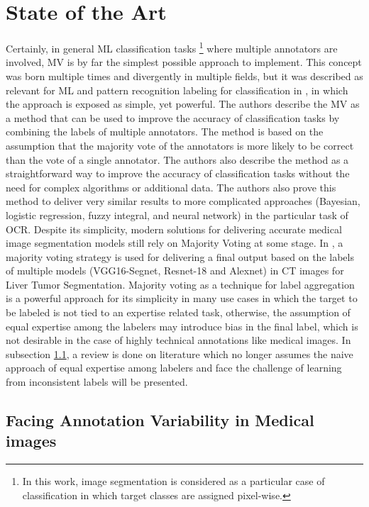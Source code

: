 \section{State of the Art}\label{sec:state_of_the_art}

Certainly, in general \gls{ML} classification tasks \footnote{In this
  work, image segmentation is considered as a particular case of classification
in which target classes are assigned pixel-wise.} where multiple
annotators are involved, \gls{MV} is by far the simplest
possible approach to implement. This concept was born multiple times
and divergently in multiple fields, but it was described as relevant
for \gls{ML} and pattern recognition labeling for classification in
\cite{LamAndSuen1997}, in which the approach is exposed as simple,
yet powerful. The authors describe the \gls{MV} as a method that can
be used to improve the accuracy of classification tasks by combining
the labels of multiple annotators. The method is based on the
assumption that the majority vote of the annotators is more likely to
be correct than the vote of a single annotator. The authors also
describe the method as a straightforward way to improve the accuracy
of classification tasks without the need for complex algorithms or
additional data. The authors also prove this method to deliver very
similar results to more complicated approaches (Bayesian, logistic
regression, fuzzy integral, and neural network) in the
particular task of \gls{OCR}. Despite its simplicity, modern
solutions for delivering accurate medical image segmentation models
still rely on Majority Voting at some stage. In \cite{Elnakib2020},
a majority voting strategy is used for delivering a final output
based on the labels of multiple models (VGG16-Segnet, Resnet-18 and
Alexnet) in \gls{CT} images for Liver Tumor Segmentation.
Majority voting as a technique for label aggregation is a powerful
approach for its simplicity in many use cases in which the target to
be labeled is not tied to an expertise related task, otherwise, the
assumption of equal expertise among the labelers may introduce
bias in the final label, which is not desirable in the
case of highly technical annotations like medical images. In
subsection \ref{subsec:expertise_levels_lit_review}, a review is done on
literature which no longer assumes the naive approach of equal
expertise among labelers and face the challenge of learning from
inconsistent labels will be presented.

\subsection{Facing Annotation Variability in Medical
images}\label{subsec:expertise_levels_lit_review}

